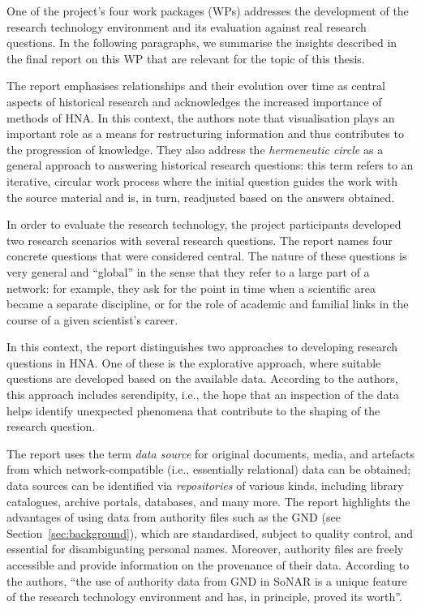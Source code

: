 One of the project's four work packages (WPs)
addresses the development of the research technology environment
and its evaluation against real research questions.
In the following paragraphs,
we summarise the insights described in the final report on this WP \autocite{Fangerau2022}
that are relevant for the topic of this thesis.

The report emphasises relationships and their evolution over time
as central aspects of historical research and acknowledges the increased 
importance of methods of HNA. In this context, the authors note that visualisation plays an important role
as a means for restructuring information and thus contributes to the progression of knowledge.
They also address the \emph{hermeneutic circle} \autocite{Malpas2015}
as a general approach to answering historical research questions:
this term refers to an iterative, circular work process
where the initial question guides the work with the source material
and is, in turn, readjusted based on the answers obtained.

In order to evaluate the research technology,
the project participants developed two research scenarios
with several research questions.
The report names four concrete questions that were considered central.
The nature of these questions is very general and \enquote{global}
in the sense that they refer to a large part of a network:
for example, they ask for the point in time when a scientific area became a separate discipline,
or for the role of academic and familial links in the course of a given scientist's career.

In this context, the report distinguishes two approaches to developing research questions
in HNA. One of these is the explorative approach,
where suitable questions are developed based on the available data.
According to the authors, this approach includes serendipity,
i.e., the hope that an inspection of the data helps identify unexpected
phenomena that contribute to the shaping of the research question.

The report uses the term \emph{data source} for original documents, media, and artefacts
from which network-compatible (i.e., essentially relational) data can be obtained;
data sources can be identified via \emph{repositories} of various kinds,
including library catalogues, archive portals, databases, and many more.
The report highlights the advantages of using data from authority files
such as the GND (see Section~\ref{sec:background}), which are standardised,
subject to quality control, and essential for disambiguating personal names.
Moreover, authority files are freely accessible and provide information
on the provenance of their data. According to the authors,
\enquote{the use of authority data from GND in SoNAR is a unique feature
of the research technology environment and has, in principle, proved its worth}.

